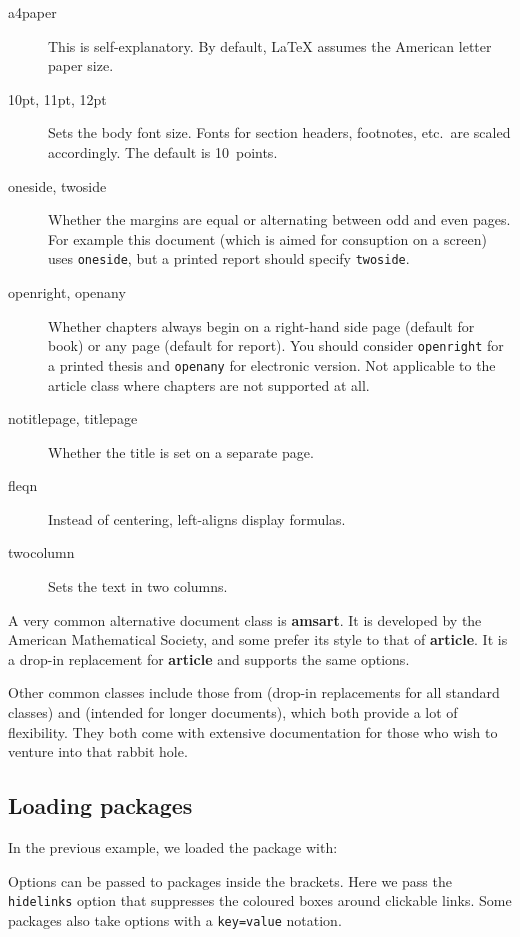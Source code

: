 \begin{description}
\item[a4paper] This is self-explanatory.
    By default, \LaTeX{} assumes the American letter paper size.
\item[10pt, 11pt, 12pt] Sets the body font size.
    Fonts for section headers, footnotes, etc.\ are scaled accordingly.
    The default is 10~points.
\item[oneside, twoside] Whether the margins are equal
    or alternating between odd and even pages.
    For example this document (which is aimed for consuption on a screen)
    uses \verb|oneside|, but a printed report should specify \verb|twoside|.
\item[openright, openany]
    Whether chapters always begin on a right-hand side page (default for book)
    or any page (default for report).
    You should consider \verb|openright| for a printed thesis
    and \verb|openany| for electronic version.
    Not applicable to the article class where chapters are not supported at all.
\item[notitlepage, titlepage] Whether the title is set on a separate page.
\item[fleqn] Instead of centering, left-aligns display formulas.
\item[twocolumn] Sets the text in two columns.
\end{description}


A very common alternative document class is \textbf{amsart}.
It is developed by the American Mathematical Society,
and some prefer its style to that of \textbf{article}.
It is a drop-in replacement for \textbf{article} and supports the same options.

Other common classes include those from 
(drop-in replacements for all standard classes)
and  (intended for longer documents),
which both provide a lot of flexibility.
They both come with extensive documentation for those who wish to venture into that rabbit hole.


%
\subsection{Loading packages}\label{sec:loading packages}

In the previous example, we loaded the  package with:
\begin{ExampleCode}
\usepackage[hidelinks]{hyperref}
\end{ExampleCode}
Options can be passed to packages inside the brackets.
Here we pass the \verb|hidelinks| option that suppresses the coloured boxes around clickable links.
Some packages also take options with a \verb|key=value| notation.

